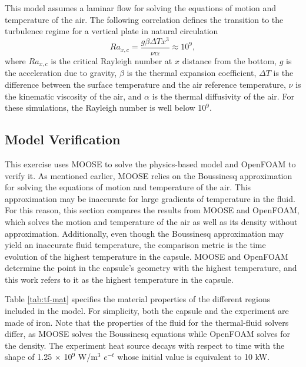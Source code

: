This model assumes a laminar flow for solving the equations of motion and temperature of the air.
The following correlation defines the transition to the turbulence regime for a vertical plate in natural circulation \cite{incropera_fundamentals_2006}
\begin{equation}
Ra_{x,c} = \frac{g \beta \Delta T x^3}{\nu \alpha} \approx 10^9,
\end{equation}
where $Ra_{x,c}$ is the critical Rayleigh number at $x$ distance from the bottom, $g$ is the acceleration due to gravity, $\beta$ is the thermal expansion coefficient, $\Delta T$ is the difference between the surface temperature and the air reference temperature, $\nu$ is the kinematic viscosity of the air, and $\alpha$ is the thermal diffusivity of the air.
For these simulations, the Rayleigh number is well below 10$^9$.


\subsection{Model Verification}

This exercise uses MOOSE to solve the physics-based model and OpenFOAM to verify it.
As mentioned earlier, MOOSE relies on the Boussinesq approximation for solving the equations of motion and temperature of the air.
This approximation may be inaccurate for large gradients of temperature in the fluid.
For this reason, this section compares the results from MOOSE and OpenFOAM, which solves the motion and temperature of the air as well as its density without approximation.
Additionally, even though the Boussinesq approximation may yield an inaccurate fluid temperature, the comparison metric is the time evolution of the highest temperature in the capsule.
MOOSE and OpenFOAM determine the point in the capsule's geometry with the highest temperature, and this work refers to it as the highest temperature in the capsule.

Table \ref{tab:tf-mat} specifies the material properties of the different regions included in the model.
For simplicity, both the capsule and the experiment are made of iron.
Note that the properties of the fluid for the thermal-fluid solvers differ, as MOOSE solves the Boussinesq equations while OpenFOAM solves for the density.
The experiment heat source decays with respect to time with the shape of 1.25 $\times$ 10$^9$ W/m$^3$ $e^{-t}$ whose initial value is equivalent to 10 kW.

